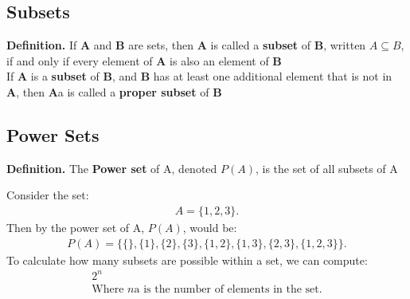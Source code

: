 \documentclass{report}
\begin{document}
    \bigbreak \noindent \bigbreak \noindent 
    \subsection{Subsets}
    \bigbreak \noindent 
    \begin{mdframed}
        \textbf{Definition.} 
        If \textbf{A} and \textbf{B} are sets, then \textbf{A} is called a \textbf{subset} of \textbf{B}, written $A \subseteq B$, if and only if every element of \textbf{A} is also an element of \textbf{B} \\
        If \textbf{A} is a \textbf{subset} of \textbf{B}, and \textbf{B} has at least one additional element that is not in \textbf{A}, then \textbf{A}a is called a \textbf{proper subset} of \textbf{B}
    \end{mdframed}

    \bigbreak \noindent \bigbreak \noindent 
    \subsection{Power Sets}
    \bigbreak \noindent 
    \begin{mdframed}
        \textbf{Definition.}
        The \textbf{Power set} of A, denoted $P(A)$, is the set of all subsets of A
    \end{mdframed}
    \bigbreak \noindent 
    Consider the set:
    \begin{align*}
        A = \{1,2,3\}
    .\end{align*}
    Then by the power set of A, $P(A)$, would be:
    \begin{align*}
        P(A) = \{\{\}, \{1\}, \{2\}, \{3\}, \{1,2\}, \{1,3\}, \{2,3\}, \{1,2,3\}\}
    .\end{align*}
    To calculate how many subsets are possible within a set, we can compute:
    \begin{align*}
        2^{n} \\
        \text{Where $n$a is the number of elements in the set}
    .\end{align*}

    \pagebreak \bigbreak \noindent 
\end{document}
